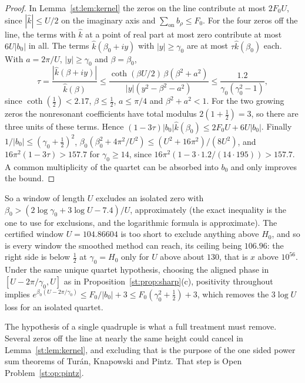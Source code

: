 \begin{proof}
In Lemma~\ref{st:lem:kernel} the zeros on the line contribute at most $2F_0U$, since $|\hat k|\le U/2$ on the imaginary axis and $\sum_{\mathrm{on}}b_\rho\le F_0$. For the four zeros off the line, the terms with $\hat k$ at a point of real part at most zero contribute at most $6U|b_0|$ in all. The terms $\hat k(\beta_0+iy)$ with $|y|\ge\gamma_0$ are at most $\tau\hat k(\beta_0)$ each. With $a=2\pi/U$, $|y|\ge\gamma_0$ and $\beta=\beta_0$,
\[
\tau=\frac{|\hat k(\beta+iy)|}{\hat k(\beta)}\le\frac{\coth(\beta U/2)\,\beta(\beta^2+a^2)}{|y|(y^2-\beta^2-a^2)}\le\frac{1.2}{\gamma_0(\gamma_0^2-1)},
\]
since $\coth(\tfrac12)<2.17$, $\beta\le\tfrac12$, $a\le\pi/4$ and $\beta^2+a^2<1$. For the two growing zeros the nonresonant coefficients have total modulus $2(1+\tfrac12)=3$, so there are three units of these terms. Hence $(1-3\tau)|b_0|\hat k(\beta_0)\le2F_0U+6U|b_0|$. Finally $1/|b_0|\le(\gamma_0+\tfrac12)^2$, $\beta_0(\beta_0^2+4\pi^2/U^2)\le(U^2+16\pi^2)/(8U^2)$, and $16\pi^2(1-3\tau)>157.7$ for $\gamma_0\ge14$, since $16\pi^2(1-3\cdot1.2/(14\cdot195))>157.7$. A common multiplicity of the quartet can be absorbed into $b_0$ and only improves the bound.
\end{proof}
So a window of length $U$ excludes an isolated zero with $\beta_0>(2\log\gamma_0+3\log U-7.4)/U$, approximately (the exact inequality is the one to use for exclusions, and the logarithmic formula is approximate). The certified window $U=104.86604$ is too short to exclude anything above $H_0$, and so is every window the smoothed method can reach, its ceiling being $106.96$: the right side is below $\tfrac12$ at $\gamma_0=H_0$ only for $U$ above about $130$, that is $x$ above $10^{56}$. Under the same unique quartet hypothesis, choosing the aligned phase in $[U-2\pi/\gamma_0,U]$ as in Proposition~\ref{st:prop:sharp}(c), positivity throughout implies $e^{\beta_0(U-2\pi/\gamma_0)}\le F_0/|b_0|+3\le F_0(\gamma_0^2+\tfrac12)+3$, which removes the $3\log U$ loss for an isolated quartet.

The hypothesis of a single quadruple is what a full treatment must remove. Several zeros off the line at nearly the same height could cancel in Lemma~\ref{st:lem:kernel}, and excluding that is the purpose of the one sided power sum theorems of Tur\'an, Knapowski and Pintz. That step is Open Problem~\ref{st:op:pintz}.

